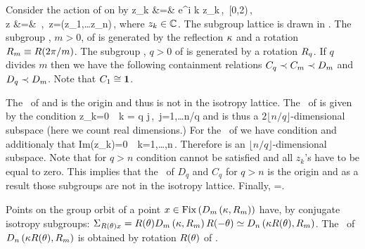 \begin{example} %
 Consider the action of  on  by
 \bea
	\Rot{\theta} z_k &=& e^{i k \theta} z_k\,,\ \theta\in[0,2\pi)\,,\label{eq:SO2stndrd} \\
	\Refl z &=& \,,\  z=(z_1,\ldots z_n)\,,
	\label{eq:O2stndrd}
 \eea
where $z_k\in\mathbb{C}^{}$. The subgroup lattice is drawn in . The subgroup 
, $m>0$, of  is generated by the reflection $\kappa$ and a rotation $R_{m}\equiv R(2\pi/m)$. 
The subgroup , $q>0$ of  is generated by a rotation $R_{q}$.
If $q$ divides $m$ then we have the following containment relations $C_{q}\prec C_{m}\prec D_{m}$ 
and $D_{q}\prec D_{m}$. Note that $C_{1}\cong\mathbf{1}$.

The \fixedsp\ of  and  is the origin and thus  is not in the isotropy lattice. 
The \fixedsp\ of  is given by the condition
\beq
	z_k=0\ \ k = q j\,,\ j=1,\ldots\lfloor n/q \rfloor 
	\label{eq:O2CqFix}
\eeq
and is thus a $2 \lfloor n/q\rfloor$-dimensional subspace (here we count real dimensions.)  
For the \fixedsp\ of  we have condition  and additionaly that
\beq
	Im(z_k)=0\ \ k=1,\ldots,n\,.
\eeq 
Therefore  is an $ \lfloor n/q\rfloor$-dimensional subspace. Note that for $q>n$ condition
 cannot be satisfied and all $z_k$'s have to be equal to zero. This implies that the \fixedsp\ of $D_q$ and $C_q$ for $q>n$ is the origin and as a result those subgroups are not in the isotropy lattice. Finally, \Fix{\Idg}=.

Points on the group orbit of a point  $x\in\mathrm{Fix}\left(D_{m}\left(\kappa,R_{m}\right)\right)$ have, by  conjugate
isotropy subgroups: $\Sigma_{R(\theta)x}=R(\theta)D_{m}\left(\kappa,R_{m}\right)R(-\theta)\simeq D_{n}\left(\kappa R(\theta),R_{m}\right)$. The \fixedsp\ of $D_{n}\left(\kappa R(\theta),R_{m}\right)$ is obtained by rotation $R(\theta)$ of .





\end{example}
